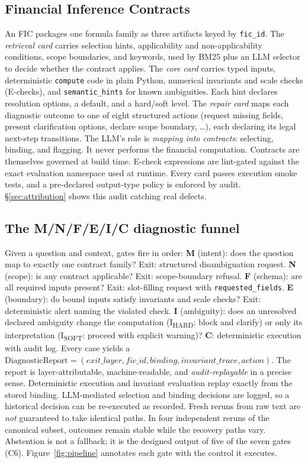 \subsection{Financial Inference Contracts}
An FIC packages one formula family as three artifacts keyed by \texttt{fic\_id}.
The \emph{retrieval card} carries selection hints, applicability and non-applicability conditions, scope boundaries, and keywords, used by BM25 plus an LLM selector to decide whether the contract applies.
The \emph{core card} carries typed inputs, deterministic \texttt{compute} code in plain Python, numerical invariants and scale checks (E-checks), and \texttt{semantic\_hints} for known ambiguities.
Each hint declares resolution options, a default, and a hard/soft level.
The \emph{repair card} maps each diagnostic outcome to one of eight structured actions (request missing fields, present clarification options, declare scope boundary, \ldots), each declaring its legal next-step transitions.
The LLM's role is \emph{mapping into contracts}: selecting, binding, and flagging.
It never performs the financial computation.
Contracts are themselves governed at build time.
E-check expressions are lint-gated against the exact evaluation namespace used at runtime.
Every card passes execution smoke tests, and a pre-declared output-type policy is enforced by audit.
\S\ref{sec:attribution} shows this audit catching real defects.

\subsection{The M/N/F/E/I/C diagnostic funnel}
Given a question and context, gates fire in order:
\textbf{M} (intent): does the question map to exactly one contract family? Exit: structured disambiguation request.
\textbf{N} (scope): is any contract applicable? Exit: scope-boundary refusal.
\textbf{F} (schema): are all required inputs present? Exit: slot-filling request with \texttt{requested\_fields}.
\textbf{E} (boundary): do bound inputs satisfy invariants and scale checks? Exit: deterministic alert naming the violated check.
\textbf{I} (ambiguity): does an unresolved declared ambiguity change the computation (I\textsubscript{HARD}: block and clarify) or only its interpretation (I\textsubscript{SOFT}: proceed with explicit warning)?
\textbf{C}: deterministic execution with audit log.
Every case yields a $\mathrm{DiagnosticReport}=(\textit{exit\_layer},\textit{fic\_id},\textit{binding},\textit{invariant\_trace},\textit{action})$.
The report is layer-attributable, machine-readable, and \emph{audit-replayable} in a precise sense.
Deterministic execution and invariant evaluation replay exactly from the stored binding.
LLM-mediated selection and binding decisions are logged, so a historical decision can be re-executed as recorded.
Fresh reruns from raw text are \emph{not} guaranteed to take identical paths.
In four independent reruns of the canonical subset, outcomes remain stable while the recovery paths vary.
Abstention is not a fallback; it is the designed output of five of the seven gates (C6).
Figure~\ref{fig:pipeline} annotates each gate with the control it executes.

